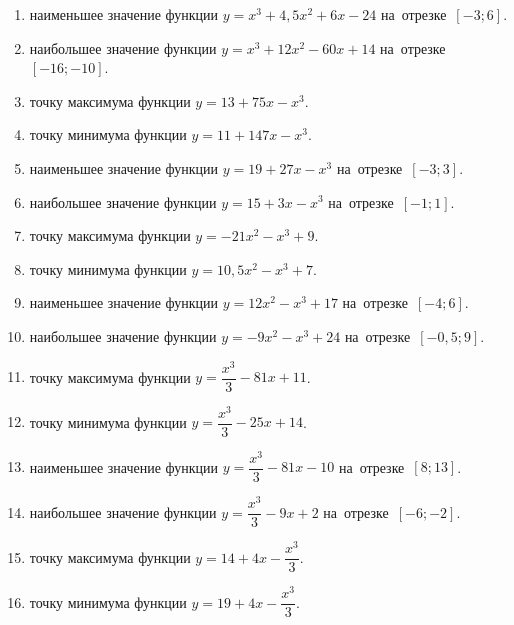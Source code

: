 \documentclass[a4paper,10pt]{article}
\begin{document}
\begin{enumerate}
\item {} наименьшее значение функции $y=x^3 +4,5x^2+6x-24$ на~отрезке~$\left[-3;6\right]$.

\item {} наибольшее значение функции $y=x^3 +12x^2-60x+14$ на~отрезке~$\left[-16;-10\right]$.

\item {} точку максимума функции $y=13+75x-x^3$.

\item {} точку минимума функции $y=11+147x-x^3$.

\item {} наименьшее значение функции $y=19+27x-x^3$ на~отрезке~$\left[-3;3\right]$.

\item {} наибольшее значение функции $y=15+3x-x^3$ на~отрезке~$\left[-1;1\right]$.

\item {} точку максимума функции $y=-21x^2-x^3+9$.

\item {} точку минимума функции $y=10,5x^2-x^3+7$.

\item {} наименьшее значение функции $y=12x^2-x^3+17$ на~отрезке~$\left[-4;6\right]$.

\item {} наибольшее значение функции $y=-9x^2-x^3+24$ на~отрезке~$\left[-0,5;9\right]$.

\item {} точку максимума функции $y=\dfrac{x^3}{3} -81x+11$.

\item {} точку минимума функции $y=\dfrac{x^3}{3} -25x+14$.

\item {} наименьшее значение функции $y=\dfrac{x^3}{3} -81x-10$ на~отрезке~$\left[8;13\right]$.

\item {} наибольшее значение функции $y=\dfrac{x^3}{3} -9x+2$ на~отрезке~$\left[-6;-2\right]$.

\item {} точку максимума функции $y=14 +4x-\dfrac{x^3}{3}$.

\item {} точку минимума функции $y=19 +4x-\dfrac{x^3}{3}$.


\end{enumerate}
\end{document}
